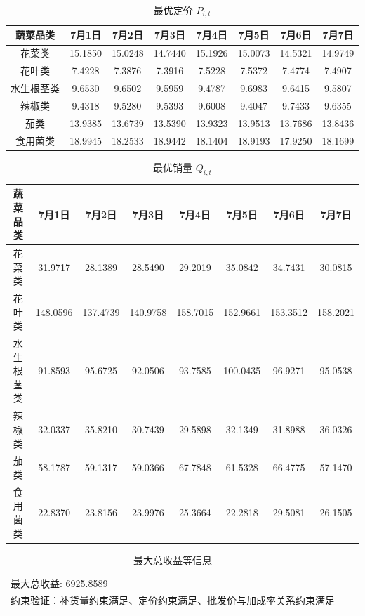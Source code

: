 \documentclass{cumcmthesis}
\begin{document}
\begin{table}[htbp]
    \centering
    \caption{最优定价 $P_{i,t}$}
    \begin{tabular}{cccccccc}
        \hline
        蔬菜品类  & 7月1日 & 7月2日 & 7月3日 & 7月4日 & 7月5日 & 7月6日 & 7月7日 \\
        \hline
        花菜类  & 15.1850 & 15.0248 & 14.7440 & 15.1926 & 15.0073 & 14.5321 & 14.9749 \\
        花叶类   & 7.4228 & 7.3876 & 7.3916 & 7.5228 & 7.5372 & 7.4774 & 7.4907 \\
        水生根茎类 & 9.6530 & 9.6502 & 9.5959 & 9.4787 & 9.6983 & 9.6415 & 9.5807 \\
        辣椒类  & 9.4318 & 9.5280 & 9.5393 & 9.6008 & 9.4047 & 9.7433 & 9.6355 \\
        茄类   &13.9385 & 13.6739 & 13.5390 & 13.9323 & 13.9513 & 13.7686 & 13.8436 \\
        食用菌类  &18.9945 & 18.2533 & 18.9442 & 18.1404 & 18.9193 & 17.9250 & 18.1699 \\
        \hline
    \end{tabular}
\end{table}

\begin{table}[htbp]
    \centering
    \caption{最优销量 $Q_{i,t}$}
    \begin{tabular}{cccccccc}
        \hline
        蔬菜品类  & 7月1日 & 7月2日 & 7月3日 & 7月4日 & 7月5日 & 7月6日 & 7月7日 \\
        \hline
        花菜类  & 31.9717 & 28.1389 & 28.5490 & 29.2019 & 35.0842 & 34.7431 & 30.0815 \\
        花叶类   & 148.0596 & 137.4739 & 140.9758 & 158.7015 & 152.9661 & 153.3512 & 158.2021 \\
        水生根茎类 & 91.8593 & 95.6725 & 92.0506 & 93.7585 & 100.0435 & 96.9271 & 95.0538 \\
        辣椒类  & 32.0337 & 35.8210 & 30.7439 & 29.5898 & 32.1349 & 31.8988 & 36.0326 \\
        茄类   &58.1787 & 59.1317 & 59.0366 & 67.7848 & 61.5328 & 66.4775 & 57.1470 \\
        食用菌类  &22.8370 & 23.8156 & 23.9976 & 25.3664 & 22.2818 & 29.5081 & 26.1505 \\
        \hline
    \end{tabular}
\end{table}

\begin{table}[htbp]
    \centering
    \caption{最大总收益等信息}
    \begin{tabular}{l}
        \hline
        最大总收益: 6925.8589 \\
        约束验证：补货量约束满足、定价约束满足、批发价与加成率关系约束满足 \\
        \hline
    \end{tabular}
\end{table}
\end{document}
